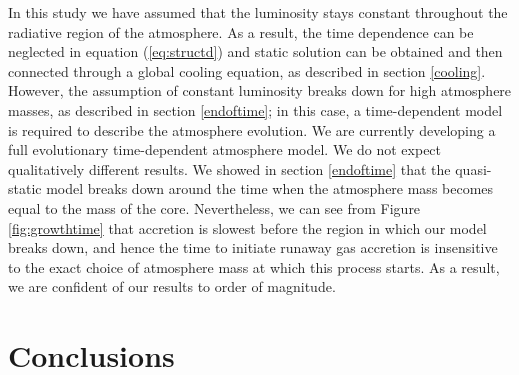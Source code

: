 \documentclass[apj]{emulateapj}
\newcommand{\delad}{\nabla_{\rm ad}}
\begin{document}
 In this study we have assumed that the luminosity stays constant throughout the radiative region of the atmosphere. As a result, the time dependence can be neglected in equation (\ref{eq:structd}) and static solution can be obtained and then connected through a global cooling equation, as described in section \ref{cooling}. However, the assumption of constant luminosity breaks down for high atmosphere masses, as described in section \ref{endoftime}; in this case, a time-dependent model is required to describe the atmosphere evolution. We are currently developing a full evolutionary time-dependent atmosphere model. We do not expect qualitatively different results. We showed in section \ref{endoftime} that the quasi-static model breaks down around the time when the atmosphere mass becomes equal to the mass of the core. Nevertheless, we can see from Figure \ref{fig:growthtime} that accretion is slowest before the region in which our model breaks down, and hence the time to initiate runaway gas accretion is insensitive to the exact choice of atmosphere mass at which this process starts. As a result, we are confident of our results to order of magnitude.
 
 


 
 
 \section{Conclusions}
 \label{conclusions}
 
\end{document}
